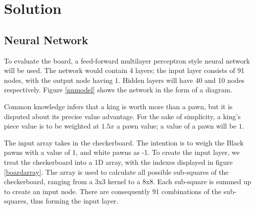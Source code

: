 \documentclass[12pt,a4paper]{article}
\begin{document}
\section{Solution}


 

    \subsection{Neural Network}
        To evaluate the board, a feed-forward multilayer perceptron style neural network will be used. The network would contain 4 layers; the input layer consists of 91 nodes, with the output node having 1. Hidden layers will have 40 and 10 nodes respectively. Figure \ref{nnmodel} shows the network in the form of a diagram.

        Common knowledge infers that a king is worth more than a pawn, but it is disputed about its precise value advantage. For the sake of simplicity, a king's piece value is to be weighted at $1.5x$ a pawn value; a value of a pawn will be $1$. 

        The input array takes in the checkerboard. The intention is to weigh the Black pawns with a value of 1, and white pawns as -1. To create the input layer, we treat the checkerboard into a 1D array, with the indexes displayed in figure \ref{boardarray}. The array is used to calculate all possible sub-squares of the checkerboard, ranging from a 3x3 kernel to a 8x8. Each sub-square is summed up to create an input node. There are consequently 91 combinations of the sub-squares, thus forming the input layer. 
\end{document}
